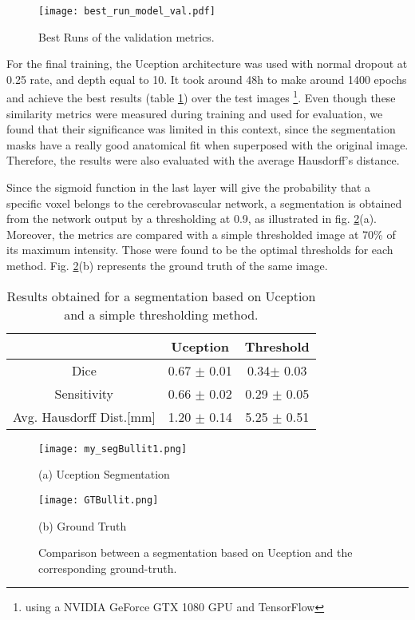 \documentclass{article}
\begin{document}
\begin{figure}[ht]
\texttt{[image: best\_run\_model\_val.pdf]}
\caption{Best Runs of the validation metrics.}
\label{fig:best_val}
\end{figure}

For the final training, the Uception architecture was used with normal dropout at 0.25 rate, and depth equal to 10. It took around 48h to make around 1400 epochs and achieve the best results (table \ref{table:results}) over the test images \footnote{using a NVIDIA GeForce GTX 1080 GPU and TensorFlow}.  Even though these similarity metrics were measured during training and used for evaluation, we found that their significance was limited in this context, since the segmentation masks have a really good anatomical fit when superposed with the original image. Therefore, the results were also evaluated with the average Hausdorff's distance.

Since the sigmoid function in the last layer will give the probability that a specific voxel belongs to the cerebrovascular network, a segmentation is obtained from the network output by a thresholding at 0.9, as illustrated in fig. \ref{fig:resukts_img}(a). Moreover, the metrics are compared with a simple thresholded image at 70\% of its maximum intensity. Those were found to be the optimal thresholds for each method. Fig. \ref{fig:resukts_img}(b) represents the ground truth of the same image.

\begin{table}[ht]
\begin{tabular}{||c||c|c||}
\hline
& Uception & Threshold \\ [0.5ex]
\hline\hline
Dice &   0.67 $\pm$ 0.01 & 0.34$\pm$ 0.03 \\
\hline
Sensitivity & 0.66 $\pm$ 0.02 & 0.29 $\pm$ 0.05 \\[1ex]
 \hline
Avg. Hausdorff Dist.[mm]  & 1.20 $\pm$  0.14 & 5.25 $\pm$  0.51 \\[1ex]
 \hline
\end{tabular}
\caption{Results obtained for a segmentation based on Uception and a simple thresholding method.}
\label{table:results}
\end{table}


\begin{figure}[htb]
\begin{minipage}[b]{.48\linewidth}
  \centering
  \centerline{\texttt{[image: my\_segBullit1.png]}}
  \centerline{(a) Uception Segmentation}\medskip
\end{minipage}
\begin{minipage}[b]{0.48\linewidth}
  \centering
  \centerline{\texttt{[image: GTBullit.png]}}
  \centerline{(b) Ground Truth}\medskip
\end{minipage}
\caption{Comparison between a segmentation based on Uception and the corresponding ground-truth.}
\label{fig:resukts_img}
\end{figure}
\end{document}

